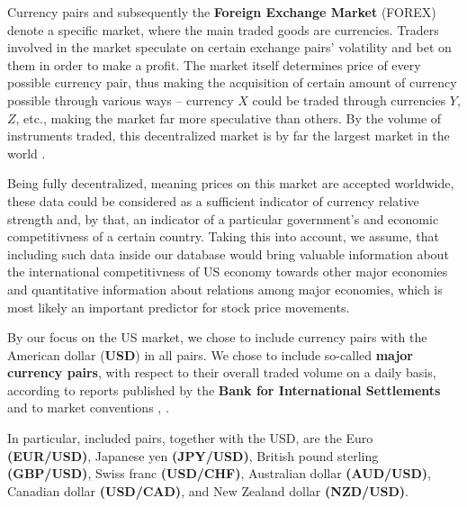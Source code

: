 Currency pairs and subsequently the \textbf{Foreign Exchange Market} (FOREX) denote a specific market, where the main traded goods are currencies. Traders involved in the market speculate 
on certain exchange pairs' volatility and bet on them in order to make a profit. The market itself determines
price of every possible currency pair, thus making the acquisition of certain amount of currency possible through various ways – currency $X$ could be
traded through currencies $Y$, $Z$, etc., making the market far more speculative than others. By the volume of instruments traded, this decentralized 
market is by far the largest market in the world \cite{forex1}.
\par
Being fully decentralized, meaning prices on this market are accepted worldwide, these data could be considered as a sufficient
indicator of currency relative strength and, by that, an indicator of a particular government's and economic competitivness of a certain country. Taking this into account,
we assume, that including such data inside our database would bring valuable information about the international competitivness of US economy towards other major economies 
and quantitative information about relations among major economies, which is most likely an important predictor for stock price movements.
\par
By our focus on the US market, we chose to include currency pairs with the American dollar (\textbf{USD}) in all pairs. We chose to include so-called \textbf{major currency pairs},
with respect to their overall traded volume on a daily basis, according to reports published by the \textbf{Bank for International Settlements} and to market conventions \cite{bis_report}, \cite{forex1}.
\par
In particular, included pairs, together with the USD, are the Euro \textbf{(EUR/USD)}, Japanese yen \textbf{(JPY/USD)}, British pound sterling \textbf{(GBP/USD)}, Swiss franc \textbf{(USD/CHF)}, Australian dollar \textbf{(AUD/USD)}, Canadian dollar \textbf{(USD/CAD)}, and New Zealand dollar \textbf{(NZD/USD)}.

